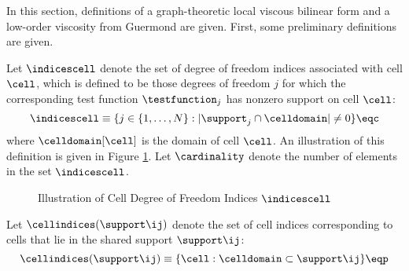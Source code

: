 In this section, definitions of a graph-theoretic local viscous bilinear form
and a low-order viscosity from Guermond \cite{guermond_firstorder} are given.
First, some preliminary definitions are given.

Let $\indicescell$ denote the set of degree of freedom indices associated with
cell $\cell$, which is defined to be those degrees of freedom $j$ for which the
corresponding test function $\testfunction_j$ has nonzero support on cell
$\cell$:
\begin{equation}
  \indicescell \equiv \{j\in\{1,\ldots,N\}: |\support_j\cap \celldomain|\ne 0\}
  \eqc
\end{equation}
where $\celldomain[\cell]$ is the domain of cell $\cell$. An illustration of
this definition is given in Figure \ref{fig:cell_indices}.
Let $\cardinality$ denote the number of elements in the set $\indicescell$.
\begin{figure}[ht]
   \centering
     
      \caption{Illustration of Cell Degree of Freedom Indices $\indicescell$}
   \label{fig:cell_indices}
\end{figure}
Let $\cellindices(\support\ij)$ denote the set of cell indices corresponding
to cells that lie in the shared support $\support\ij$:
\begin{equation}
  \cellindices(\support\ij) \equiv \{\cell: \celldomain \subset \support\ij\}
  \eqp
\end{equation}

